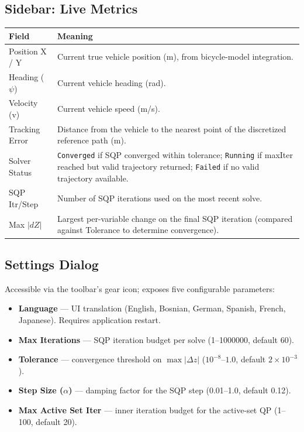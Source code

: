 ﻿\documentclass[11pt,a4paper]{article}
\begin{document}
\subsection{Sidebar: Live Metrics}
\begin{center}
\begin{tabular}{@{}lp{9.7cm}@{}}
\toprule
Field & Meaning \\
\midrule
Position X / Y & Current true vehicle position (m), from bicycle-model integration. \\
Heading ($\psi$) & Current vehicle heading (rad). \\
Velocity (v) & Current vehicle speed (m/s). \\
Tracking Error & Distance from the vehicle to the nearest point of the discretized reference path (m). \\
Solver Status & \texttt{Converged} if SQP converged within tolerance; \texttt{Running} if maxIter reached but valid trajectory returned; \texttt{Failed} if no valid trajectory available. \\
SQP Itr/Step & Number of SQP iterations used on the most recent solve. \\
Max $|dZ|$ & Largest per-variable change on the final SQP iteration (compared against Tolerance to determine convergence). \\
\bottomrule
\end{tabular}
\end{center}

\subsection{Settings Dialog}
Accessible via the toolbar's gear icon; exposes five configurable parameters:
\begin{itemize}[leftmargin=1.2cm]
  \item \textbf{Language} --- UI translation (English, Bosnian, German, Spanish, French, Japanese). Requires application restart.
  \item \textbf{Max Iterations} --- SQP iteration budget per solve (1--1000000, default 60).
  \item \textbf{Tolerance} --- convergence threshold on $\max|\Delta z|$ ($10^{-8}$--$1.0$, default $2\times10^{-3}$).
  \item \textbf{Step Size ($\alpha$)} --- damping factor for the SQP step (0.01--1.0, default 0.12).
  \item \textbf{Max Active Set Iter} --- inner iteration budget for the active-set QP (1--100, default 20).
\end{itemize}
\end{document}
